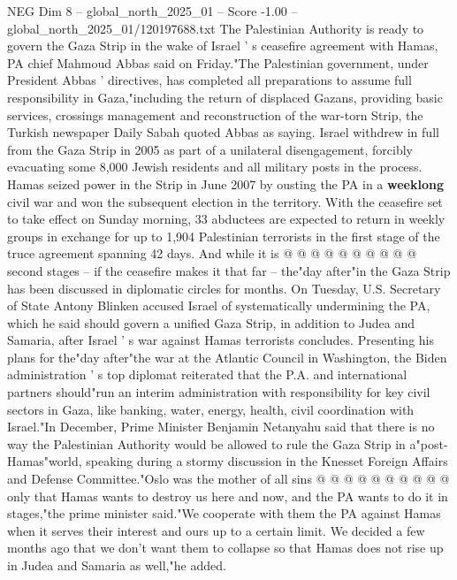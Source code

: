 \begin{textsample}{NEG Dim 8 – global\_north\_2025\_01 – Score -1.00 – global\_north\_2025\_01/120197688.txt}  \label{ex:f8_neg_343}
The Palestinian Authority is ready to govern the Gaza Strip in the wake of Israel ' s ceasefire agreement with Hamas, PA chief Mahmoud Abbas said on Friday."The Palestinian government, under President Abbas ' directives, has completed all preparations to assume full responsibility in Gaza,"including the return of displaced Gazans, providing basic services, crossings management and reconstruction of the war-torn Strip, the Turkish newspaper Daily Sabah quoted Abbas as saying.
Israel withdrew in full from the Gaza Strip in 2005 as part of a unilateral disengagement, forcibly evacuating some 8,000 Jewish residents and all military posts in the process.
Hamas seized power in the Strip in June 2007 by ousting the PA in a \textbf{weeklong} civil war and won the subsequent election in the territory.
With the ceasefire set to take effect on Sunday morning, 33 abductees are expected to return in weekly groups in exchange for up to 1,904 Palestinian terrorists in the first stage of the truce agreement spanning 42 days.
And while it is @ @ @ @ @ @ @ @ @ @ second stages -- if the ceasefire makes it that far -- the"day after"in the Gaza Strip has been discussed in diplomatic circles for months.
On Tuesday, U.S.
Secretary of State Antony Blinken accused Israel of systematically undermining the PA, which he said should govern a unified Gaza Strip, in addition to Judea and Samaria, after Israel ' s war against Hamas terrorists concludes.
Presenting his plans for the"day after"the war at the Atlantic Council in Washington, the Biden administration ' s top diplomat reiterated that the P.A. and international partners should"run an interim administration with responsibility for key civil sectors in Gaza, like banking, water, energy, health, civil coordination with Israel."In December, Prime Minister Benjamin Netanyahu said that there is no way the Palestinian Authority would be allowed to rule the Gaza Strip in a"post-Hamas"world, speaking during a stormy discussion in the Knesset Foreign Affairs and Defense Committee."Oslo was the mother of all sins @ @ @ @ @ @ @ @ @ @ only that Hamas wants to destroy us here and now, and the PA wants to do it in stages,"the prime minister said."We cooperate with them the PA against Hamas when it serves their interest and ours up to a certain limit.
We decided a few months ago that we don't want them to collapse so that Hamas does not rise up in Judea and Samaria as well,"he added.

\end{textsample}
